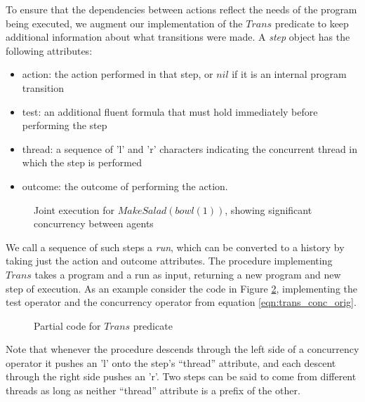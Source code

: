 To ensure that the dependencies between actions reflect the needs
of the program being executed, we augment our implementation of the
$Trans$ predicate to keep additional information about what transitions
were made. A \emph{step} object has the following attributes:

\begin{itemize}
\item action: the action performed in that step, or $nil$ if it is an internal
program transition 
\item test: an additional fluent formula that must hold immediately before
performing the step 
\item thread: a sequence of 'l' and 'r' characters indicating the concurrent
thread in which the step is performed 
\item outcome: the outcome of performing the action. 
\end{itemize}
%
\begin{figure}

\caption{ Joint execution for $MakeSalad(bowl(1))$, showing significant concurrency
between agents }


\label{fig:plan-output} 
\end{figure}


We call a sequence of such steps a \emph{run}, which can be converted
to a history by taking just the action and outcome attributes. The
procedure implementing $Trans$ takes a program and a run as input,
returning a new program and new step of execution. As an example consider
the code in Figure \ref{fig:trans-code}, implementing the test operator
and the concurrency operator from equation \ref{eqn:trans_conc_orig}.

%
\begin{figure}

\caption{ Partial code for $Trans$ predicate }


\label{fig:trans-code} 
\end{figure}


Note that whenever the procedure descends through the left side of
a concurrency operator it pushes an 'l' onto the step's {}``thread''
attribute, and each descent through the right side pushes an 'r'.
Two steps can be said to come from different threads as long as neither
{}``thread'' attribute is a prefix of the other.

